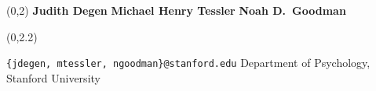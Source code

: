 \documentclass[a0,portrait]{a0poster}
\newcommand{\superlightgray}[1]{\textcolor{superlightgray}{#1}}
\newcommand{\xxlightgray}[1]{\textcolor{xxlightgray}{#1}}
\def\LHead#1{\noindent{\LARGE\color{myBlue} #1}}
\begin{document}
\begin{textblock}{15}(0,2)
\centering
\LARGE{   \textbf{Judith Degen}   \hspace{3cm}    \textbf{Michael Henry Tessler}  \hspace{3cm}  \textbf{Noah D.~Goodman} }
\end{textblock}



\begin{textblock}{15}(0,2.2)
\begin{center}
\Large{\texttt{\{jdegen, mtessler, ngoodman\}@stanford.edu} \hspace{1cm} Department of Psychology, Stanford University}
\end{center}
\end{textblock}


%
%
%
%
%
%



\end{document}
